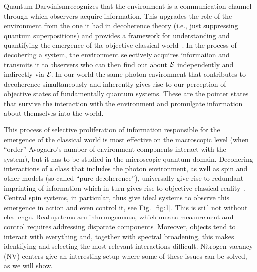 \documentclass[aps,prl,floatfix,twocolumn,footinbib,superscriptaddress]{revtex4-1}
\begin{document}
\maketitle

Quantum Darwinismrecognizes that the environment is a communication channel through which observers acquire information. This upgrades the role of the environment from the one it had in decoherence theory (i.e., just suppressing quantum superpositions) and provides a framework for understanding and quantifying the emergence of the objective classical world~\cite{Ollivier04-1,Ollivier05-1,Blume-Kohout2005,zur09,Zwolak13-1,Zurek14-1,Zwolak14,Pawel15,zwolak16,Zwolak17-1,Gerardo18}. In the process of decohering a system, the environment selectively acquires information  and transmits it to observers who can then find out about $\S$ independently and indirectly via $\E$. In our world the same photon environment that contributes to decoherence simultaneously and inherently gives rise to our perception of objective states of fundamentally quantum systems. These are the pointer states that survive the interaction with the environment and promulgate information about themselves into the world.

This process of selective proliferation of information responsible for the emergence of the classical world is most effective on the macroscopic level (when ``order'' Avogadro's number of environment components interact with the system), but it has to be studied in the microscopic quantum domain. Decohering interactions of a class that includes the photon environment, as well as spin and other models (so called ``pure decoherence''), universally give rise to redundant imprinting of information which in turn gives rise to objective classical reality~\cite{Zwolak14,zwolak16}.  Central spin systems, in particular, thus give ideal systems to observe this emergence in action and even control it, see Fig.~\ref{fig:1}. This is still not without challenge. Real systems are inhomogeneous, which means measurement and control requires addressing disparate components. Moreover, objects tend to interact with everything and, together with spectral broadening, this makes identifying and selecting the most relevant interactions difficult. Nitrogen-vacancy (NV) centers give an interesting setup where some of these issues can be solved, as we will show.  
\end{document}
